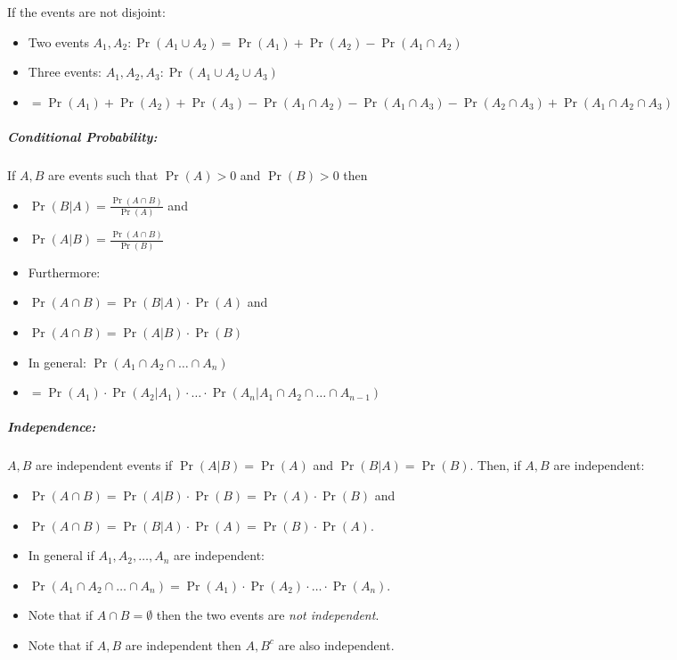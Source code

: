 \documentclass[landscape,10pt]{article}
\begin{document}
\begin{multicols}{4}
    If the events are not disjoint: 
        \begin{itemize}
            \item[] Two events \(A_1, A_2: \Pr(A_1 \cup A_2) = \Pr(A_1) + \Pr(A_2) - \Pr(A_1 \cap A_2)\)
            \item[] Three events: \(A_1, A_2, A_3: \Pr(A_1 \cup A_2 \cup A_3)\)
            \item[] \(= \Pr(A_1) + \Pr(A_2) + \Pr(A_3) - \Pr(A_1 \cap A_2) - \Pr(A_1 \cap A_3) - \Pr(A_2 \cap A_3) + \Pr(A_1 \cap A_2 \cap A_3)\)
        \end{itemize}  

    \subparagraph*{Conditional Probability: }
        If \(A, B\) are events such that \(\Pr(A) > 0\) and \(\Pr(B) > 0\) then 
        \begin{itemize}
            \item[] \(\Pr(B|A) = \frac{\Pr(A\cap B)}{\Pr(A)}\) and 
            \item[] \(\Pr(A|B) = \frac{\Pr(A \cap B)}{\Pr(B)}\) 
            \item[] Furthermore: 
            \item[] \(\Pr(A \cap B) = \Pr(B|A) \cdot \Pr(A)\) and 
            \item[] \(\Pr(A \cap B) = \Pr(A|B) \cdot \Pr(B)\) 
            \item[] In general: \(\Pr(A_1 \cap A_2 \cap \ldots \cap A_n) \)
            \item[] \(= \Pr(A_1) \cdot \Pr(A_2 | A_1) \cdot \ldots \cdot \Pr(A_n | A_1 \cap A_2 \cap \ldots \cap A_{n-1})\)
        \end{itemize}

    \subparagraph*{Independence:}
        \(A, B\) are independent events if \(\Pr(A|B) = \Pr(A)\) and \(\Pr(B|A) = \Pr(B)\). Then, if \(A, B\) are independent: 
        \begin{itemize}
            \item[] \(\Pr(A \cap B) = \Pr(A|B) \cdot \Pr(B) = \Pr(A) \cdot \Pr(B)\) and 
            \item[] \(\Pr(A \cap B) = \Pr(B | A) \cdot \Pr(A) = \Pr(B) \cdot \Pr(A)\).
            \item[] In general if \(A_1, A_2, \ldots, A_n\) are independent: 
            \item[] \(\Pr(A_1 \cap A_2 \cap \ldots \cap A_n) = \Pr(A_1) \cdot \Pr(A_2) \cdot \ldots \cdot \Pr(A_n)\). 
            \item[] Note that if \(A \cap B = \emptyset\) then the two events are \textit{not independent}. 
            \item[] Note that if \(A, B\) are independent then \(A, B^c\) are also independent.
        \end{itemize}


\end{multicols}
\end{document}
